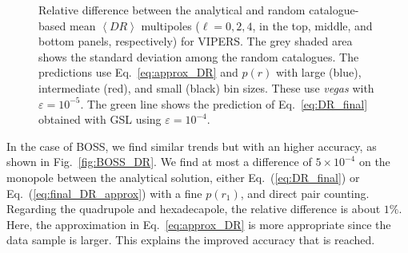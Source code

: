 \documentclass{aa}
\begin{document}
\begin{figure}
    \caption{Relative difference between the analytical and random catalogue-based mean $\left<DR\right>$  multipoles ($\ell = 0,2,4$, in the top, middle, and bottom panels, respectively) for VIPERS. The grey shaded area shows the standard deviation among the random catalogues. The predictions use Eq.~\eqref{eq:approx_DR} and $p(r)$ with large (blue), intermediate (red), and small (black) bin sizes. These use \emph{vegas} with $\varepsilon = 10^{-5}$. The green line shows the prediction of Eq.~\eqref{eq:DR_final} obtained with GSL using $\varepsilon = 10^{-4}$.}
    \label{fig:VIPERS_DR}
\end{figure}
%

In the case of BOSS, we find similar trends but with an higher accuracy, as shown in Fig.~\ref{fig:BOSS_DR}. We find at most a difference of $5\times10^{-4}$ on the monopole between the analytical solution, either Eq.~(\ref{eq:DR_final}) or Eq.~(\ref{eq:final_DR_approx}) with a fine $p(r_1)$, and direct pair counting. Regarding the quadrupole and hexadecapole, the relative difference is about $1\%$. Here, the approximation in Eq.~\eqref{eq:approx_DR} is more appropriate since the data sample is larger. This explains the improved accuracy that is reached.
%
\end{document}
